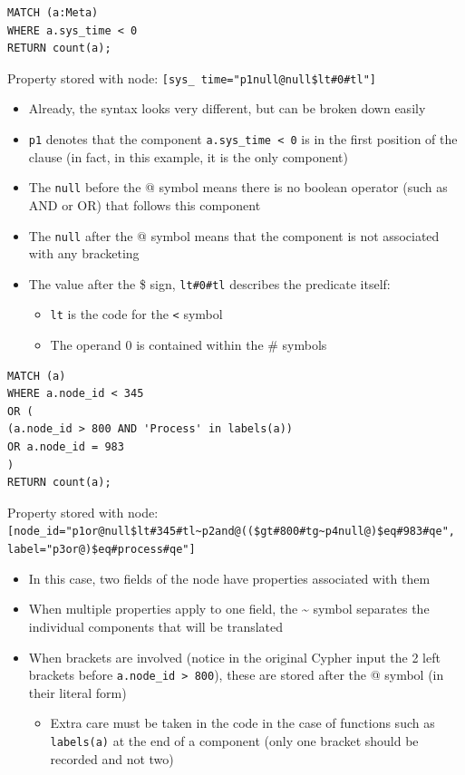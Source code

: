 \documentclass[letterpaper]{ltxdoc}
\begin{document}
\bigskip

\begin{lstlisting}[language=Cypher]
MATCH (a:Meta)
WHERE a.sys_time < 0
RETURN count(a);
\end{lstlisting}

Property stored with node: \texttt{[sys\_ time="p1null@null\$lt\#0\#tl"]}

\begin{itemize}
\item Already, the syntax looks very different, but can be broken down easily
\item \texttt{p1} denotes that the component \texttt{a.sys\_time < 0} is in the first position of the clause (in fact, in this example, it is the only component)
\item The \texttt{null} before the @ symbol means there is no boolean operator (such as AND or OR) that follows this component
\item The \texttt{null} after the @ symbol means that the component is not associated with any bracketing
\item The value after the \$ sign, \texttt{lt\#0\#tl} describes the predicate itself:
\begin{itemize}
\item \texttt{lt} is the code for the \texttt{<} symbol
\item The operand 0 is contained within the \# symbols
\end{itemize}
\end{itemize}

\bigskip

\begin{lstlisting}[language=Cypher]
MATCH (a)
WHERE a.node_id < 345
OR (
(a.node_id > 800 AND 'Process' in labels(a))
OR a.node_id = 983
)
RETURN count(a);
\end{lstlisting}

Property stored with node:
\texttt{[node\_id="p1or@null\$lt\#345\#tl\textasciitilde p2and@((\$gt\#800\#tg\textasciitilde p4null@)\$eq\#983\#qe", label="p3or@)\$eq\#process\#qe"]}

\begin{itemize}
\item In this case, two fields of the node have properties associated with them
\item When multiple properties apply to one field, the \textasciitilde {} symbol separates the individual components that will be translated
\item When brackets are involved (notice in the original Cypher input the 2 left brackets before \texttt{a.node\_id > 800}), these are stored after the @ symbol (in their literal form)
\begin{itemize}
\item Extra care must be taken in the code in the case of functions such as \texttt{labels(a)} at the end of a component (only one bracket should be recorded and not two)
\end{itemize}
\end{itemize}
\end{document}
